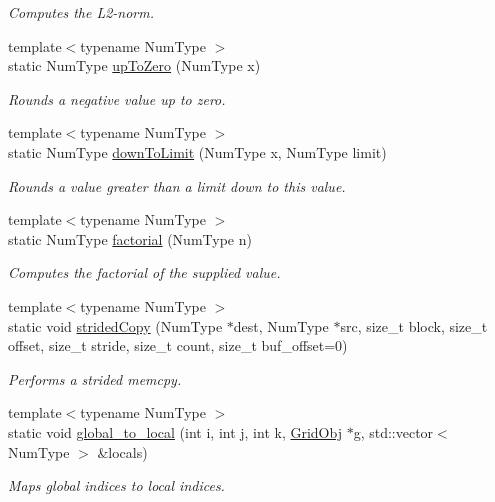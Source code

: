 \begin{DoxyCompactItemize}
\begin{DoxyCompactList}\small\item\em Computes the L2-\/norm. \end{DoxyCompactList}\item 
{\footnotesize template$<$typename Num\+Type $>$ }\\static Num\+Type \hyperlink{class_grid_utils_a5a3e26a94e62833f0a9e5a4bda066dac}{up\+To\+Zero} (Num\+Type x)
\begin{DoxyCompactList}\small\item\em Rounds a negative value up to zero. \end{DoxyCompactList}\item 
{\footnotesize template$<$typename Num\+Type $>$ }\\static Num\+Type \hyperlink{class_grid_utils_abd4068e22339d5272ca551f8cbddec26}{down\+To\+Limit} (Num\+Type x, Num\+Type limit)
\begin{DoxyCompactList}\small\item\em Rounds a value greater than a limit down to this value. \end{DoxyCompactList}\item 
{\footnotesize template$<$typename Num\+Type $>$ }\\static Num\+Type \hyperlink{class_grid_utils_a57edeaeba2d67d187a9edd0b560fe0c2}{factorial} (Num\+Type n)
\begin{DoxyCompactList}\small\item\em Computes the factorial of the supplied value. \end{DoxyCompactList}\item 
{\footnotesize template$<$typename Num\+Type $>$ }\\static void \hyperlink{class_grid_utils_aa3ca6e20ef4fa927cb845956d7565b1e}{strided\+Copy} (Num\+Type $\ast$dest, Num\+Type $\ast$src, size\+\_\+t block, size\+\_\+t offset, size\+\_\+t stride, size\+\_\+t count, size\+\_\+t buf\+\_\+offset=0)
\begin{DoxyCompactList}\small\item\em Performs a strided memcpy. \end{DoxyCompactList}\item 
{\footnotesize template$<$typename Num\+Type $>$ }\\static void \hyperlink{class_grid_utils_a28cba8aa8cbe5dd20fa3405e2f46eeb2}{global\+\_\+to\+\_\+local} (int i, int j, int k, \hyperlink{class_grid_obj}{Grid\+Obj} $\ast$g, std\+::vector$<$ Num\+Type $>$ \&locals)
\begin{DoxyCompactList}\small\item\em Maps global indices to local indices. \end{DoxyCompactList}\item 

\end{DoxyCompactItemize}
